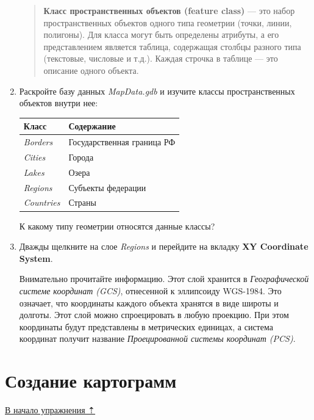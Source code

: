 \documentclass[]{book}
\theoremstyle{definition}
\theoremstyle{definition}
\theoremstyle{definition}
\theoremstyle{remark}
\begin{document}
\begin{enumerate}
  \begin{quote}
  \textbf{Класс пространственных объектов (feature class)} --- это набор
  пространственных объектов одного типа геометрии (точки, линии,
  полигоны). Для класса могут быть определены атрибуты, а его
  представлением является таблица, содержащая столбцы разного типа
  (текстовые, числовые и т.д.). Каждая строчка в таблице --- это
  описание одного объекта.
  \end{quote}
\item
  Раскройте базу данных \emph{MapData.gdb} и изучите классы
  пространственных объектов внутри нее:

  \begin{longtable}[]{@{}ll@{}}
  \toprule
  \textbf{Класс} & \textbf{Содержание}\tabularnewline
  \midrule
  \endhead
  \emph{Borders} & Государственная граница РФ\tabularnewline
  \emph{Cities} & Города\tabularnewline
  \emph{Lakes} & Озера\tabularnewline
  \emph{Regions} & Субъекты федерации\tabularnewline
  \emph{Countries} & Страны\tabularnewline
  \bottomrule
  \end{longtable}

  К какому типу геометрии относятся данные классы?
\item
  Дважды щелкните на слое \emph{Regions} и перейдите на вкладку
  \textbf{XY Coordinate System}.

  Внимательно прочитайте информацию. Этот слой хранится в
  \emph{Географической системе координат (GCS)}, отнесенной к эллипсоиду
  WGS-1984. Это означает, что координаты каждого объекта хранятся в виде
  широты и долготы. Этот слой можно спроецировать в любую проекцию. При
  этом координаты будут представлены в метрических единицах, а система
  координат получит название \emph{Проецированной системы координат
  (PCS)}.
\end{enumerate}

\hypertarget{map-design-economic-choropleth}{%
\section{Создание картограмм}\label{map-design-economic-choropleth}}

\protect\hyperlink{map-design-economic}{В начало упражнения ⇡}
\end{document}
